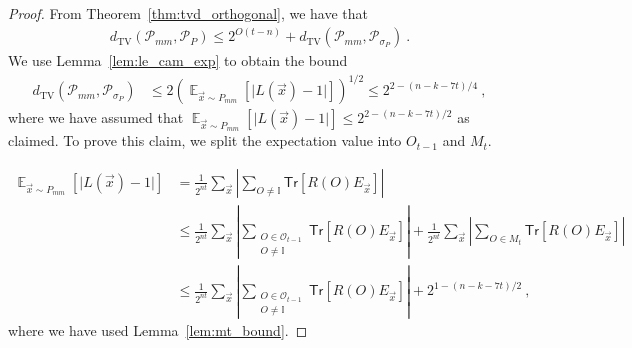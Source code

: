 \documentclass[11pt]{article}
\newcommand{\E}{\mathop{\mathbb{E}}}
\newcommand{\id}{\ensuremath{\mathbb{I}}}
\newcommand{\Tr}{\mathsf{Tr}}
\newcommand{\TV}{d_{\text{TV}}}
\newcommand{\Oc}{\mathcal{O}}
\begin{document}
\begin{proof}
    From Theorem~\ref{thm:tvd_orthogonal}, we have that
    \begin{align}
        \TV(\mathcal{P}_{mm},\mathcal{P}_P) \leq 2^{O(t-n)} +\TV(\mathcal{P}_{mm},\mathcal{P}_{\sigma_P})\ . 
    \end{align}
    We use Lemma~\ref{lem:le_cam_exp} to obtain the bound
    \begin{align}
        \TV(\mathcal{P}_{mm},\mathcal{P}_{\sigma_P}) & \leq 2\left( \E_{\vec{x}\sim P_{mm}}[\vert L(\vec{x})-1\vert] \right)^{1/2} \leq 2^{2-(n-k-7t)/4}\ ,
    \end{align}
    where we have assumed that $\E_{\vec{x}\sim P_{mm}}[\vert L(\vec{x})-1\vert] \leq 2^{2-(n-k-7t)/2}$ as claimed. To prove this claim, we split the expectation value into $O_{t-1}$ and $M_t$.

    \begin{align}
        \E_{\vec{x}\sim P_{mm}}[\vert L(\vec{x})-1\vert] & = \frac{1}{2^{nt}}\sum_{\vec{x}} \left\vert\sum_{O \neq \id} \Tr[R(O)E_{\vec{x}}] \right\vert\\
        & \leq \frac{1}{2^{nt}}\sum_{\vec{x}} \left\vert\sum_{\substack{O \in \Oc_{t-1}\\ O\neq \id}} \Tr[R(O)E_{\vec{x}}] \right\vert + \frac{1}{2^{nt}}\sum_{\vec{x}} \left\vert\sum_{O\in M_t} \Tr[R(O)E_{\vec{x}}] \right\vert\\
        & \leq \frac{1}{2^{nt}}\sum_{\vec{x}} \left\vert\sum_{\substack{O \in \Oc_{t-1}\\ O\neq \id}} \Tr[R(O)E_{\vec{x}}] \right\vert + 2^{1-(n-k-7t)/2} \ ,
    \end{align}
    where we have used Lemma~\ref{lem:mt_bound}.


\end{proof}
\end{document}
